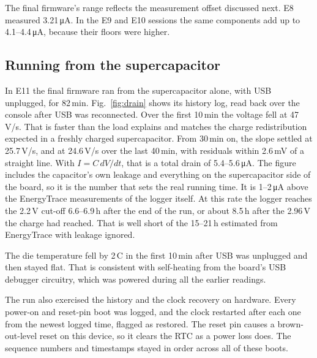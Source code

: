 \documentclass[conference]{IEEEtran}
\newcommand{\uA}{\,\si{\micro\ampere}}
\begin{document}
The final firmware's range reflects the measurement offset discussed next. E8 measured 3.21\uA{}. In the E9 and E10 sessions the same components add up to 4.1--4.4\uA, because their floors were higher.

\subsection{Running from the supercapacitor}

In E11 the final firmware ran from the supercapacitor alone, with USB unplugged, for 82\,min. Fig.~\ref{fig:drain} shows its history log, read back over the console after USB was reconnected. Over the first 10\,min the voltage fell at 47\,\textmu V/s. That is faster than the load explains and matches the charge redistribution expected in a freshly charged supercapacitor. From 30\,min on, the slope settled at 25.7\,\textmu V/s, and at 24.6\,\textmu V/s over the last 40\,min, with residuals within 2.6\,mV of a straight line. With $I = C\,dV/dt$, that is a total drain of 5.4--5.6\uA. The figure includes the capacitor's own leakage and everything on the supercapacitor side of the board, so it is the number that sets the real running time. It is 1--2\uA{} above the EnergyTrace measurements of the logger itself. At this rate the logger reaches the 2.2\,V cut-off 6.6--6.9\,h after the end of the run, or about 8.5\,h after the 2.96\,V the charge had reached. That is well short of the 15--21\,h estimated from EnergyTrace with leakage ignored.

The die temperature fell by 2\,\textdegree C in the first 10\,min after USB was unplugged and then stayed flat. That is consistent with self-heating from the board's USB debugger circuitry, which was powered during all the earlier readings.

The run also exercised the history and the clock recovery on hardware. Every power-on and reset-pin boot was logged, and the clock restarted after each one from the newest logged time, flagged as restored. The reset pin causes a brown-out-level reset on this device, so it clears the RTC as a power loss does. The sequence numbers and timestamps stayed in order across all of these boots.
\end{document}
